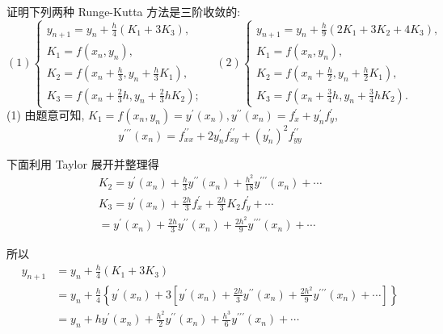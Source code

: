     \begin{tcolorbox}[enhanced,colback=8,colframe=7,breakable,coltitle=green!25!black,title=2024]
 证明下列两种 Runge-Kutta 方法是三阶收敛的:
 $$(1) \left\{\begin{array}{l}y_{n+1}=y_{n}+\frac{h}{4}\left(K_{1}+3 K_{3}\right), \\ K_{1}=f\left(x_{n}, y_{n}\right), \\ K_{2}=f\left(x_{n}+\frac{h}{3}, y_{n}+\frac{h}{3} K_{1}\right), \\ K_{3}=f\left(x_{n}+\frac{2}{3} h, y_{n}+\frac{2}{3} h K_{2}\right) ;\end{array} \quad(2)\left\{\begin{array}{l}y_{n+1}=y_{n}+\frac{h}{9}\left(2 K_{1}+3 K_{2}+4 K_{3}\right), \\ K_{1}=f\left(x_{n}, y_{n}\right), \\ K_{2}=f\left(x_{n}+\frac{h}{2}, y_{n}+\frac{h}{2} K_{1}\right), \\ K_{3}=f\left(x_{n}+\frac{3}{4} h, y_{n}+\frac{3}{4} h K_{2}\right) .\end{array}\right.\right. $$
 \tcblower
 (1) 由题意可知, $ K_{1}=f\left(x_{n}, y_{n}\right)=y^{\prime}\left(x_{n}\right), y^{\prime \prime}\left(x_{n}\right)=f_{x}^{\prime}+y_{n}^{\prime} f_{y}^{\prime} $,
$$
y^{\prime \prime \prime}\left(x_{n}\right)=f_{x x}^{\prime \prime}+2 y_{n}^{\prime} f_{x y}^{\prime \prime}+\left(y_{n}^{\prime}\right)^{2} f_{y y}^{\prime \prime}
$$

下面利用 Taylor 展开并整理得
$$
\begin{array}{c}
K_{2}=y^{\prime}\left(x_{n}\right)+\frac{h}{3} y^{\prime \prime}\left(x_{n}\right)+\frac{h^{2}}{18} y^{\prime \prime \prime}\left(x_{n}\right)+\cdots \\
K_{3}=y^{\prime}\left(x_{n}\right)+\frac{2 h}{3} f_{x}^{\prime}+\frac{2 h}{3} K_{2} f_{y}^{\prime}+\cdots \\
=y^{\prime}\left(x_{n}\right)+\frac{2 h}{3} y^{\prime \prime}\left(x_{n}\right)+\frac{2 h^{2}}{9} y^{\prime \prime \prime}\left(x_{n}\right)+\cdots
\end{array}
$$

所以
$$
\begin{aligned}
y_{n+1} & =y_{n}+\frac{h}{4}\left(K_{1}+3 K_{3}\right) \\
& =y_{n}+\frac{h}{4}\left\{y^{\prime}\left(x_{n}\right)+3\left[y^{\prime}\left(x_{n}\right)+\frac{2 h}{3} y^{\prime \prime}\left(x_{n}\right)+\frac{2 h^{2}}{9} y^{\prime \prime \prime}\left(x_{n}\right)+\cdots\right]\right\}\\
& =y_{n}+h y^{\prime}\left(x_{n}\right)+\frac{h^{2}}{2} y^{\prime \prime}\left(x_{n}\right)+\frac{h^{3}}{6} y^{\prime \prime \prime}\left(x_{n}\right)+\cdots 
\end{aligned}
$$


\end{tcolorbox}
